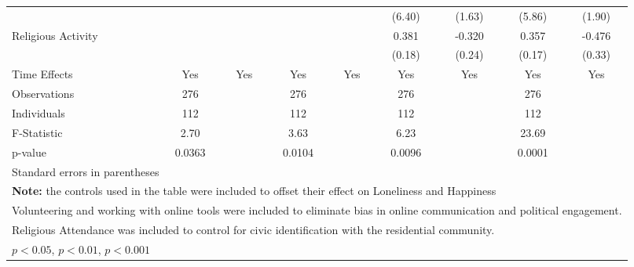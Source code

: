 \begin{table}[htbp]
\begin{tabular}{l*{8}{c}}
                              &              &              &              &              &(6.40)         &(1.63)         &(5.86)         &(1.90)         \\
\hspace{0.25cm} Religious Activity&              &              &              &              &0.381\sym{*}  &-0.320         &0.357\sym{*}  &-0.476         \\
                              &              &              &              &              &(0.18)         &(0.24)         &(0.17)         &(0.33)         \\
Time Effects                  &  Yes         &  Yes         &  Yes         &  Yes         &  Yes         &  Yes         &  Yes         &  Yes         \\
\midrule
Observations                  &  276         &              &  276         &              &  276         &              &  276         &              \\
Individuals                   &  112         &              &  112         &              &  112         &              &  112         &              \\
F-Statistic                   & 2.70         &              & 3.63         &              & 6.23         &              &23.69         &              \\
p-value                       &0.0363         &              &0.0104         &              &0.0096         &              &0.0001         &              \\
\bottomrule
\multicolumn{9}{l}{\footnotesize Standard errors in parentheses}\\
\multicolumn{9}{l}{\footnotesize \textbf{Note:} the controls used in the table were included to offset their effect on Loneliness and Happiness}\\
\multicolumn{9}{l}{\footnotesize Volunteering and working with online tools were included to eliminate bias in online communication and political engagement.}\\
\multicolumn{9}{l}{\footnotesize Religious Attendance was included to control for civic identification with the residential community.}\\
\multicolumn{9}{l}{\footnotesize \sym{*} \(p<0.05\), \sym{**} \(p<0.01\), \sym{***} \(p<0.001\)}\\
\end{tabular}
\end{table}
